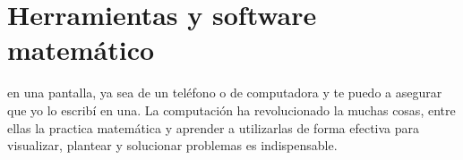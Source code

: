 \chapter{Herramientas y software matemático} %
\label{cha:herramientas_y_software_matematico}

\noindent {} en una
pantalla, ya sea de un teléfono o de computadora y te puedo a asegurar que yo lo
escribí en una. La computación ha revolucionado la muchas cosas, entre ellas la
practica matemática y aprender a utilizarlas de forma efectiva para visualizar,
plantear y solucionar problemas es indispensable.


